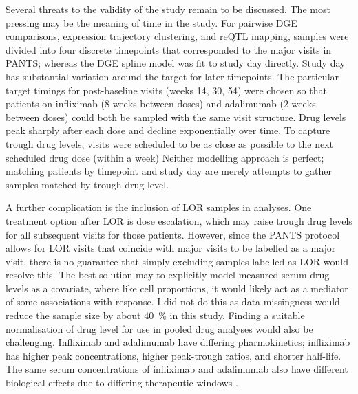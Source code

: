 Several threats to the validity of the study remain to be discussed.
The most pressing may be the meaning of time in the study.
For pairwise \gls{DGE} comparisons, expression trajectory clustering, and \gls{reQTL} mapping, 
samples were divided into four discrete timepoints that corresponded to the major visits in \gls{PANTS};
whereas the \gls{DGE} spline model was fit to study day directly.
Study day has substantial variation around the target for later timepoints.
The particular target timings for post-baseline visits (weeks 14, 30, 54) were chosen so that patients on infliximab (8 weeks between doses) and adalimumab (2 weeks between doses) could both be sampled with the same visit structure.
Drug levels peak sharply after each dose and decline exponentially over time.
To capture trough drug levels, visits were scheduled to be as close as possible to the next scheduled drug dose (within a week)
Neither modelling approach is perfect; matching patients by timepoint and study day are merely attempts to gather samples matched by trough drug level.

A further complication is the inclusion of \gls{LOR} samples in analyses.
One treatment option after \gls{LOR} is dose escalation, which may raise trough drug levels for all subsequent visits for those patients.
However, since the \gls{PANTS} protocol allows for \gls{LOR} visits that coincide with major visits to be labelled as a major visit,
there is no guarantee that simply excluding samples labelled as \gls{LOR} would resolve this.
%
The best solution may to explicitly model measured serum drug levels as a covariate, where like cell proportions, it would likely act as a mediator of some associations with response.
I did not do this as data missingness would reduce the sample size by about \SI{40}{\percent} in this study.
Finding a suitable normalisation of drug level for use in pooled drug analyses would also be challenging.
Infliximab and adalimumab have differing pharmokinetics; infliximab has higher peak concentrations, higher peak-trough ratios, and shorter half-life.
The same serum concentrations of infliximab and adalimumab also have different biological effects due to differing therapeutic windows
 \autocite{tracey2008TumorNecrosisFactor,lichtenstein2013ComprehensiveReviewAntitumor,gibson2020ReviewArticleDetermination}.

